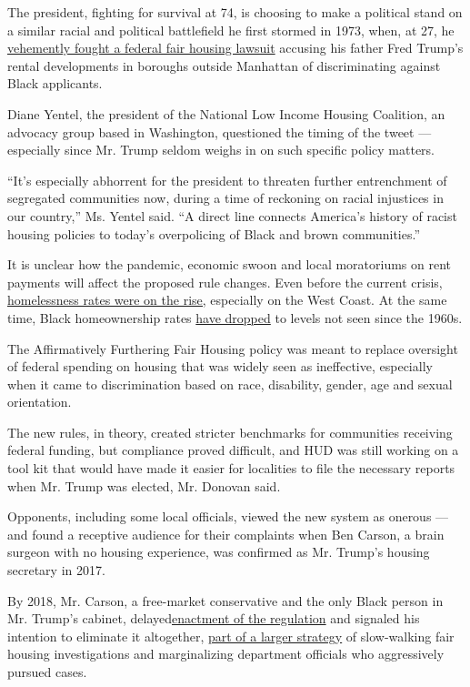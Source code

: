 The president, fighting for survival at 74, is choosing to make a
political stand on a similar racial and political battlefield he first
stormed in 1973, when, at 27, he
\href{https://www.nytimes.com/2016/08/28/us/politics/donald-trump-housing-race.html}{vehemently
fought a federal fair housing lawsuit} accusing his father Fred Trump's
rental developments in boroughs outside Manhattan of discriminating
against Black applicants.

Diane Yentel, the president of the National Low Income Housing
Coalition, an advocacy group based in Washington, questioned the timing
of the tweet --- especially since Mr. Trump seldom weighs in on such
specific policy matters.

``It's especially abhorrent for the president to threaten further
entrenchment of segregated communities now, during a time of reckoning
on racial injustices in our country,'' Ms. Yentel said. ``A direct line
connects America's history of racist housing policies to today's
overpolicing of Black and brown communities.''

It is unclear how the pandemic, economic swoon and local moratoriums on
rent payments will affect the proposed rule changes. Even before the
current crisis,
\href{https://www.nytimes.com/2019/12/20/us/politics/homelessness-trump-california.html}{homelessness
rates were on the rise,} especially on the West Coast. At the same time,
Black homeownership rates
\href{https://www.urban.org/urban-wire/five-point-strategy-reducing-black-homeownership-gap}{have
dropped} to levels not seen since the 1960s.

The Affirmatively Furthering Fair Housing policy was meant to replace
oversight of federal spending on housing that was widely seen as
ineffective, especially when it came to discrimination based on race,
disability, gender, age and sexual orientation.

The new rules, in theory, created stricter benchmarks for communities
receiving federal funding, but compliance proved difficult, and HUD was
still working on a tool kit that would have made it easier for
localities to file the necessary reports when Mr. Trump was elected, Mr.
Donovan said.

Opponents, including some local officials, viewed the new system as
onerous --- and found a receptive audience for their complaints when Ben
Carson, a brain surgeon with no housing experience, was confirmed as Mr.
Trump's housing secretary in 2017.

By 2018, Mr. Carson, a free-market conservative and the only Black
person in Mr. Trump's cabinet,
delayed\href{https://www.nytimes.com/2018/01/04/upshot/trump-delays-hud-fair-housing-obama-rule.html}{enactment
of the regulation} and signaled his intention to eliminate it
altogether,
\href{https://www.nytimes.com/2018/03/28/us/ben-carson-hud-fair-housing-discrimination.html}{part
of a larger strategy} of slow-walking fair housing investigations and
marginalizing department officials who aggressively pursued cases.

